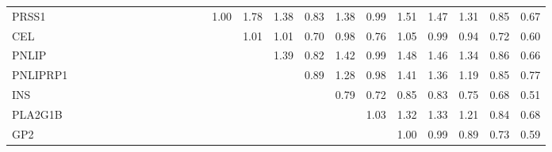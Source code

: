 \begin{longtable}{lrrrrrrrrrrrrrrrrrrrrrrr}
PRSS1    &              &              &              &             &             &             &             &              &            &            &            &             &      1.00 &        1.78 &           1.38 &      0.83 &          1.38 &      0.99 &        1.51 &        1.47 &       1.31 &        0.85 &        0.67 \\
CEL      &              &              &              &             &             &             &             &              &            &            &            &             &           &        1.01 &           1.01 &      0.70 &          0.98 &      0.76 &        1.05 &        0.99 &       0.94 &        0.72 &        0.60 \\
PNLIP    &              &              &              &             &             &             &             &              &            &            &            &             &           &             &           1.39 &      0.82 &          1.42 &      0.99 &        1.48 &        1.46 &       1.34 &        0.86 &        0.66 \\
PNLIPRP1 &              &              &              &             &             &             &             &              &            &            &            &             &           &             &                &      0.89 &          1.28 &      0.98 &        1.41 &        1.36 &       1.19 &        0.85 &        0.77 \\
INS      &              &              &              &             &             &             &             &              &            &            &            &             &           &             &                &           &          0.79 &      0.72 &        0.85 &        0.83 &       0.75 &        0.68 &        0.51 \\
PLA2G1B  &              &              &              &             &             &             &             &              &            &            &            &             &           &             &                &           &               &      1.03 &        1.32 &        1.33 &       1.21 &        0.84 &        0.68 \\
GP2      &              &              &              &             &             &             &             &              &            &            &            &             &           &             &                &           &               &           &        1.00 &        0.99 &       0.89 &        0.73 &        0.59 \\

\end{longtable}
